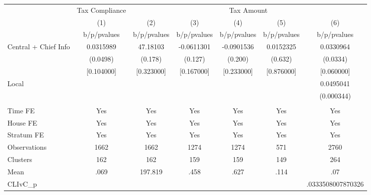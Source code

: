 {
\def\sym#1{\ifmmode^{#1}\else\(^{#1}\)\fi}
\begin{tabular}{l*{6}{c}}
\toprule
                &\multicolumn{1}{c}{Tax Compliance}&\multicolumn{5}{c}{Tax Amount}                   \\
                &\multicolumn{1}{c}{(1)}&\multicolumn{1}{c}{(2)}&\multicolumn{1}{c}{(3)}&\multicolumn{1}{c}{(4)}&\multicolumn{1}{c}{(5)}&\multicolumn{1}{c}{(6)}\\
                &b/p/pvalues&b/p/pvalues&b/p/pvalues&b/p/pvalues&b/p/pvalues&b/p/pvalues\\
\midrule
Central + Chief Info&0.0315989& 47.18103&-0.0611301&-0.0901536&0.0152325&0.0330964\\
                & (0.0498)&  (0.178)&  (0.127)&  (0.200)&  (0.632)& (0.0334)\\
                &[0.104000]&[0.323000]&[0.167000]&[0.233000]&[0.876000]&[0.060000]\\
Local           &         &         &         &         &         &0.0495041\\
                &         &         &         &         &         &(0.000344)\\
                &         &         &         &         &         &         \\
Time FE         &      Yes&      Yes&      Yes&      Yes&      Yes&      Yes\\
House FE        &      Yes&      Yes&      Yes&      Yes&      Yes&      Yes\\
Stratum FE      &      Yes&      Yes&      Yes&      Yes&      Yes&      Yes\\
\midrule
Observations    &     1662&     1662&     1274&     1274&      571&     2760\\
Clusters        &      162&      162&      159&      159&      149&      264\\
Mean            &     .069&  197.819&     .458&     .627&     .114&      .07\\
CLIvC\_p         &         &         &         &         &         &.0333508007870326\\
\bottomrule
\end{tabular}
}
